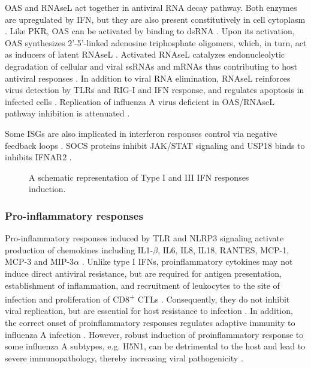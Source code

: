 		\gls{OAS} and \gls{RNAseL} act together in antiviral RNA decay pathway. Both enzymes are upregulated by \gls{IFN}, but they are also present constitutively in cell cytoplasm \parencite{Sadler2008}. Like \gls{PKR}, \gls{OAS} can be activated by binding to dsRNA \parencite{Castelli1998}. Upon its activation, \gls{OAS} synthesizes 2'-5'-linked adenosine triphosphate oligomers, which, in turn, act as inducers of latent \gls{RNAseL} \parencite{Rebouillat1999}. Activated \gls{RNAseL} catalyzes endonucleolytic degradation of cellular and viral ssRNAs and mRNAs thus contributing to host antiviral responses \parencite{Dyer2006}. In addition to viral RNA elimination, \gls{RNAseL} reinforces virus detection by \gls{TLR}s and \gls{RIG-I} and \gls{IFN} response, and regulates apoptosis in infected cells \parencite{Liang2006}. Replication of influenza A virus deficient in \gls{OAS}/\gls{RNAseL} pathway inhibition is attenuated \parencite{Min2006}.
		
		Some \gls{ISG}s are also implicated in interferon responses control via negative feedback loops \parencite{Schneider2014}. SOCS proteins inhibit JAK/STAT signaling \parencite{Hong2013} and USP18 binds to inhibits IFNAR2  \parencite{Ritchie2004}.
		
		\begin{figure} %
			\centering
			\caption{A schematic representation of Type I and III \gls{IFN} responses induction.} \label{fig:IFN}
		\end{figure}
		
		
		
		\subsubsection{Pro-inflammatory responses}
		
		Pro-inflammatory responses induced by \gls{TLR} and \gls{NLRP3} signaling activate production of chemokines including IL1-$\beta$, IL6, IL8, IL18, RANTES, MCP-1, MCP-3 and MIP-3$\alpha$ \parencite{Julkunen2000, LeGoffic2007}. Unlike type I \glspl{IFN}, proinflammatory cytokines may not induce direct antiviral resistance, but are required for antigen presentation, establishment of inflammation, and recruitment of leukocytes to the site of infection and proliferation of CD8\textsuperscript{+} \glspl{CTL} \parencite{VanDerSluijs2005, Schulz2005, LeGoffic2006}. Consequently, they do not inhibit viral replication, but are essential for host resistance to infection \parencite{Pang2013}. In addition, the correct onset of proinflammatory responses regulates adaptive immunity to influenza A infection \parencite{Trinchieri2003, Ichinohe2009}. However, robust induction of proinflammatory response to some influenza A subtypes, e.g. H5N1, can be detrimental to the host and lead to severe immunopathology, thereby increasing viral pathogenicity \parencite{LaGruta2007}.	
			
